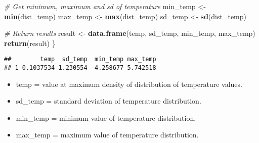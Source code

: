 \documentclass[]{article}
\newenvironment{Shaded}{\begin{snugshade}}{\end{snugshade}}
\newcommand{\CommentTok}[1]{\textcolor[rgb]{0.56,0.35,0.01}{\textit{#1}}}
\newcommand{\DecValTok}[1]{\textcolor[rgb]{0.00,0.00,0.81}{#1}}
\newcommand{\FloatTok}[1]{\textcolor[rgb]{0.00,0.00,0.81}{#1}}
\newcommand{\KeywordTok}[1]{\textcolor[rgb]{0.13,0.29,0.53}{\textbf{#1}}}
\newcommand{\NormalTok}[1]{#1}
\newcommand{\OperatorTok}[1]{\textcolor[rgb]{0.81,0.36,0.00}{\textbf{#1}}}
\newcommand{\StringTok}[1]{\textcolor[rgb]{0.31,0.60,0.02}{#1}}
\providecommand{\tightlist}{%
  \setlength{\itemsep}{0pt}\setlength{\parskip}{0pt}}
\begin{document}
\begin{Shaded}
\begin{Highlighting}[]
  \CommentTok{# Get minimum, maximum and sd of temperature}
\NormalTok{  min_temp <-}\StringTok{ }\KeywordTok{min}\NormalTok{(dist_temp)}
\NormalTok{  max_temp <-}\StringTok{ }\KeywordTok{max}\NormalTok{(dist_temp)}
\NormalTok{  sd_temp <-}\StringTok{ }\KeywordTok{sd}\NormalTok{(dist_temp)}
  
  \CommentTok{# Return results}
\NormalTok{  result <-}\StringTok{ }\KeywordTok{data.frame}\NormalTok{(temp, sd_temp, min_temp, max_temp)}
  \KeywordTok{return}\NormalTok{(result)}
\NormalTok{\}}
\end{Highlighting}
\end{Shaded}

\begin{Shaded}
\end{Shaded}

\begin{verbatim}
##        temp  sd_temp  min_temp max_temp
## 1 0.1037534 1.230554 -4.258677 5.742518
\end{verbatim}

\begin{itemize}
\tightlist
\item
  temp = value at maximum density of distribution of temperature values.
\item
  sd\_temp = standard deviation of temperature distribution.
\item
  min\_temp = minimum value of temperature distribution.
\item
  max\_temp = maximum value of temperature distribution.
\end{itemize}
\end{document}
